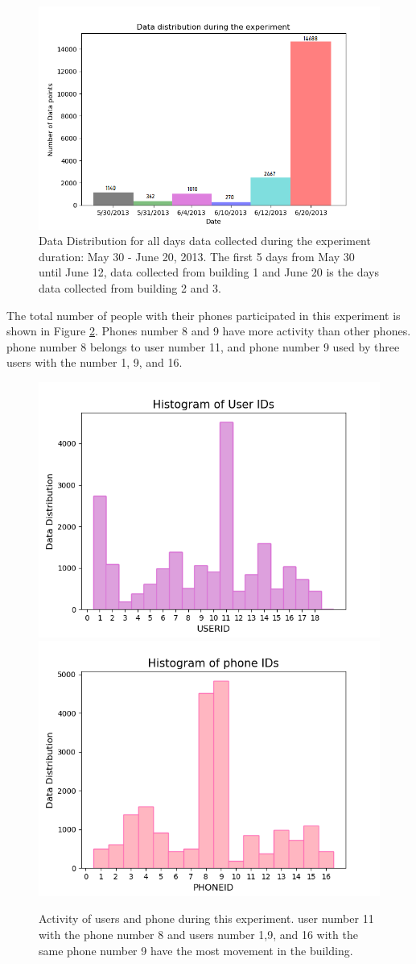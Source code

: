 \documentclass[../UNBThesis2.tex]{subfiles}
\begin{document}
\begin{figure}
    \centering
    \includegraphics[width = 12 cm]{image/Chapters/Chapter6/timedist.png}
    \caption{Data Distribution for all days data collected during the experiment duration: May 30 - June 20, 2013. The first 5  days from May 30 until June 12, data collected from building 1 and June 20 is the days data collected from building 2 and 3.}
    \label{timeline}
\end{figure}





The total number of people with their phones participated in this experiment is shown in Figure \ref{userphone}. Phones number 8 and 9 have more activity than other phones. phone number 8 belongs to user number 11, and phone number 9 used by three users with the number 1, 9, and 16.

\begin{figure}[!h]
    \centering
    \includegraphics[width=.5\textwidth]{image/Chapters/Chapter6/userID_data.png}\hfill
    \includegraphics[width=.5\textwidth]{image/Chapters/Chapter6/phoneID_data.png}
    \\[\smallskipamount]    
    \caption{Activity of users and phone during this experiment. user number 11 with the phone number 8 and users number 1,9, and 16 with the same phone number 9 have the most movement in the building.}
    \label{userphone}
\end{figure}
\end{document}
